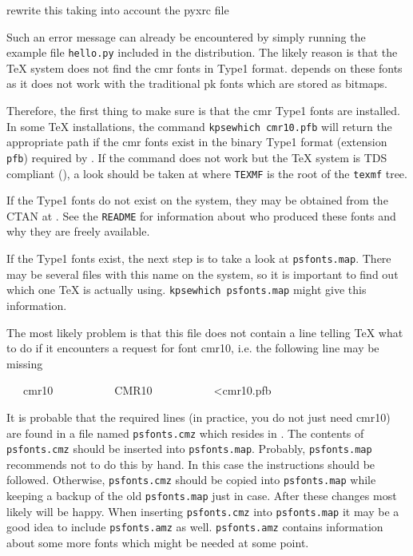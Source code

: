 \documentclass[11pt,DIV14]{scrartcl}
\begin{document}
{rewrite this taking into account the pyxrc file}
{\label{q:no_cmr10}
Such an error message can already be encountered by simply running the example
file \texttt{hello.py} included in the \PyX{} distribution. The likely reason
is that the \TeX{} system does not find the cmr fonts in Type1 format.
\PyX{} depends on these fonts as it does not work with the traditional
pk fonts which are stored as bitmaps.

Therefore, the first thing to make sure is that the cmr Type1 fonts are
installed. In some \TeX{} installations, the command \texttt{kpsewhich 
cmr10.pfb} will return the appropriate path if the cmr fonts exist in the 
binary Type1 format (extension \texttt{pfb}) required by \PyX. If the command 
does not work but the TeX{} system is TDS compliant 
(), a look should be taken at 
 where \texttt{TEXMF} is the root of the 
\texttt{texmf} tree.

If the Type1 fonts do not exist on the system, they may be obtained from
the CTAN  at . See the 
\texttt{README} for information about who produced these fonts and why they
are freely available.

If the Type1 fonts exist, the next step is to take a look at 
\texttt{psfonts.map}. There may be several files with this name on the system, 
so it is important to find out which one TeX is actually using. 
\texttt{kpsewhich psfonts.map} might give this information.

The most likely problem is that this file does not contain a line telling TeX
what to do if it encounters a request for font cmr10, i.e. the following line 
may be missing
\begin{progcode}
~~~cmr10~~~~~~~~~~~CMR10~~~~~~~~~~~<cmr10.pfb
\end{progcode}
It is probable that the required lines (in practice, you do not just need 
cmr10) are found in a file named \texttt{psfonts.cmz} which resides in 
. The contents of \texttt{psfonts.cmz} should
be inserted into \texttt{psfonts.map}. Probably, \texttt{psfonts.map} recommends
not to do this by hand. In this case the instructions should be followed. 
Otherwise, \texttt{psfonts.cmz} should be copied into \texttt{psfonts.map}
while keeping a backup of the old \texttt{psfonts.map} just in case. After
these changes \PyX{} most likely will be happy. When inserting 
\texttt{psfonts.cmz} into \texttt{psfonts.map} it may be a good idea to 
include \texttt{psfonts.amz} as well. \texttt{psfonts.amz} contains information 
about some more fonts which might be needed at some point.

}
\end{document}
